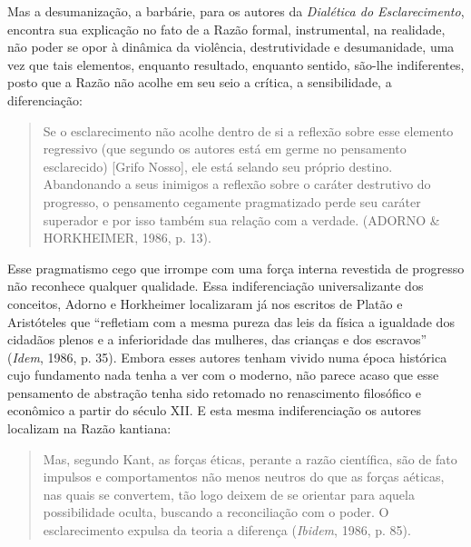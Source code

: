 Mas a desumanização, a barbárie, para os autores da \emph{Dialética do
Esclarecimento}, encontra sua explicação no fato de a Razão formal,
instrumental, na realidade, não poder se opor à dinâmica da violência,
destrutividade e desumanidade, uma vez que tais elementos, enquanto
resultado, enquanto sentido, são-lhe indiferentes, posto que a Razão não
acolhe em seu seio a crítica, a sensibilidade, a diferenciação:

\begin{quote}
Se o esclarecimento não acolhe dentro de si a reflexão sobre esse
elemento regressivo (que segundo os autores está em germe no pensamento
esclarecido) {[}Grifo Nosso{]}, ele está selando seu próprio destino.
Abandonando a seus inimigos a reflexão sobre o caráter destrutivo do
progresso, o pensamento cegamente pragmatizado perde seu caráter
superador e por isso também sua relação com a verdade. (ADORNO \&
HORKHEIMER, 1986, p. 13).
\end{quote}

Esse pragmatismo cego que irrompe com uma força interna revestida de
progresso não reconhece qualquer qualidade. Essa indiferenciação
universalizante dos conceitos, Adorno e Horkheimer localizaram já nos
escritos de Platão e Aristóteles que ``refletiam com a mesma pureza das
leis da física a igualdade dos cidadãos plenos e a inferioridade das
mulheres, das crianças e dos escravos'' (\emph{Idem}, 1986, p. 35).
Embora esses autores tenham vivido numa época histórica cujo fundamento
nada tenha a ver com o moderno, não parece acaso que esse pensamento de
abstração tenha sido retomado no renascimento filosófico e econômico a
partir do século XII. E esta mesma indiferenciação os autores localizam
na Razão kantiana:

\begin{quote}
Mas, segundo Kant, as forças éticas, perante a razão científica, são de
fato impulsos e comportamentos não menos neutros do que as forças
aéticas, nas quais se convertem, tão logo deixem de se orientar para
aquela possibilidade oculta, buscando a reconciliação com o poder. O
esclarecimento expulsa da teoria a diferença (\emph{Ibidem}, 1986, p.
85).
\end{quote}


